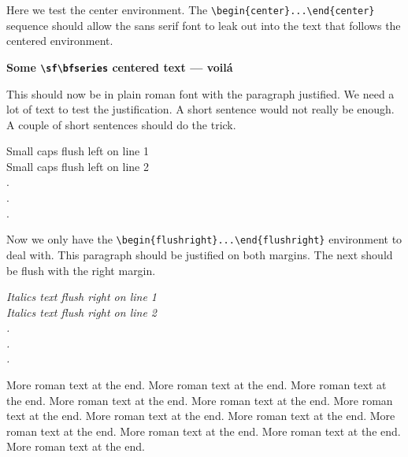\documentclass{article}
\begin{document}
Here we test the center environment.  The \verb#\begin{center}...\end{center}#
sequence should allow the sans serif font to leak out into the text that follows
the centered environment. 
\begin{center}
\sf\bfseries Some \verb#\sf\bfseries# centered text --- voil\'a
\end{center}
This should now be in plain roman font with the paragraph justified.
We need a lot of text to test the justification.  A short sentence would
not really be enough.  A couple of short sentences should do the trick.
\begin{flushleft}
\sc Small caps flush left on line 1 \\
Small caps flush left on line 2 \\
.\\
.\\
.\\
\end{flushleft}
Now we only have the \verb#\begin{flushright}...\end{flushright}# environment
to deal with.  This paragraph should be justified on both margins. The next should
be flush with the right margin.

\begin{flushright}
\itshape 
Italics text flush right on line 1 \\
Italics text flush right on line 2 \\
.\\
.\\
.\\
\end{flushright}

More roman text at the end. More roman text at the end. More roman text at the end. 
More roman text at the end. More roman text at the end. More roman text at the end.
More roman text at the end. More roman text at the end. More roman text at the end.
More roman text at the end. More roman text at the end. More roman text at the end.
\end{document}
